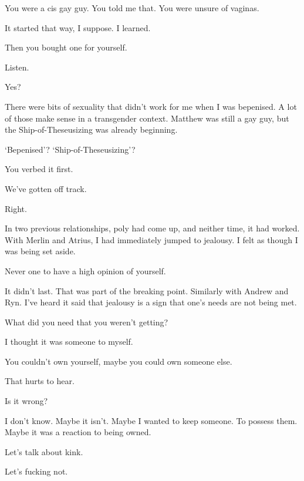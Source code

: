 \begin{leftcolumn}
\begin{ally}
You were a cis gay guy. You told me that. You were unsure of vaginas.
\end{ally}
It started that way, I suppose. I learned.

\begin{ally}
Then you bought one for yourself.
\end{ally}
Listen.

\begin{ally}
Yes?
\end{ally}
There were bits of sexuality that didn't work for me when I was bepenised. A lot of those make sense in a transgender context. Matthew was still a gay guy, but the Ship-of-Theseusizing was already beginning.

\begin{ally}
`Bepenised'? `Ship-of-Theseusizing'?
\end{ally}
You verbed it first.

\begin{ally}
We've gotten off track.
\end{ally}
Right.

In two previous relationships, poly had come up, and neither time, it had worked. With Merlin and Atrius, I had immediately jumped to jealousy. I felt as though I was being set aside.

\begin{ally}
Never one to have a high opinion of yourself.
\end{ally}
It didn't last. That was part of the breaking point. Similarly with Andrew and Ryn. I've heard it said that jealousy is a sign that one's needs are not being met.

\begin{ally}
What did you need that you weren't getting?
\end{ally}
I thought it was someone to myself.

\begin{ally}
You couldn't own yourself, maybe you could own someone else.
\end{ally}
That hurts to hear.

\begin{ally}
Is it wrong?
\end{ally}
I don't know. Maybe it isn't. Maybe I wanted to keep someone. To possess them. Maybe it was a reaction to being owned.

\begin{ally}
Let's talk about kink.
\end{ally}
Let's fucking not.
\newpage


\end{leftcolumn}
